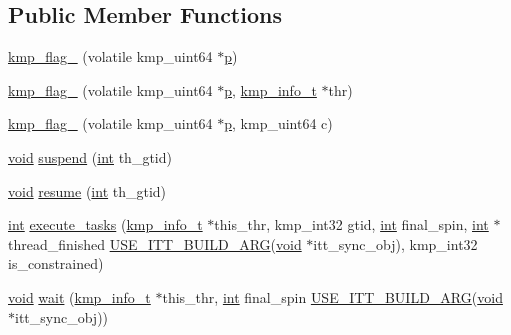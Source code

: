 \subsection*{Public Member Functions}
\begin{DoxyCompactItemize}
\item 
\hyperlink{classkmp__flag__64_a837c4745c75c9557cb92926763c2ab88}{kmp\-\_\-flag\-\_} (volatile kmp\-\_\-uint64 $\ast$\hyperlink{ittnotify__static_8h_ab7caea589d3ca96f9f11c78f10bff578}{p})
\item 
\hyperlink{classkmp__flag__64_a10a4b7f83ee61552e6e7dbb4f664a6c9}{kmp\-\_\-flag\-\_} (volatile kmp\-\_\-uint64 $\ast$\hyperlink{ittnotify__static_8h_ab7caea589d3ca96f9f11c78f10bff578}{p}, \hyperlink{kmp_8h_a194859801fe16b326efe34501a37c30a}{kmp\-\_\-info\-\_\-t} $\ast$thr)
\item 
\hyperlink{classkmp__flag__64_a7a108292b9fa2f59aeac457185ecca63}{kmp\-\_\-flag\-\_} (volatile kmp\-\_\-uint64 $\ast$\hyperlink{ittnotify__static_8h_ab7caea589d3ca96f9f11c78f10bff578}{p}, kmp\-\_\-uint64 c)
\item 
\hyperlink{ittnotify__static_8h_af941d56e55e3c5465135b60c4d6343ed}{void} \hyperlink{classkmp__flag__64_a56f6b96c1a0a87d217f401b43677447c}{suspend} (\hyperlink{ittnotify__static_8h_a8b8dcd723308a8cb5d84277c7a3fff70}{int} th\-\_\-gtid)
\item 
\hyperlink{ittnotify__static_8h_af941d56e55e3c5465135b60c4d6343ed}{void} \hyperlink{classkmp__flag__64_a66e511c15ef7cb302bcbda4d698d268b}{resume} (\hyperlink{ittnotify__static_8h_a8b8dcd723308a8cb5d84277c7a3fff70}{int} th\-\_\-gtid)
\item 
\hyperlink{ittnotify__static_8h_a8b8dcd723308a8cb5d84277c7a3fff70}{int} \hyperlink{classkmp__flag__64_acb768d08059a3c907c746f138a1c9f3a}{execute\-\_\-tasks} (\hyperlink{kmp_8h_a194859801fe16b326efe34501a37c30a}{kmp\-\_\-info\-\_\-t} $\ast$this\-\_\-thr, kmp\-\_\-int32 gtid, \hyperlink{ittnotify__static_8h_a8b8dcd723308a8cb5d84277c7a3fff70}{int} final\-\_\-spin, \hyperlink{ittnotify__static_8h_a8b8dcd723308a8cb5d84277c7a3fff70}{int} $\ast$thread\-\_\-finished \hyperlink{kmp__itt_8h_ac31864b9b5b30f5dcac5ab285ee97ae0}{U\-S\-E\-\_\-\-I\-T\-T\-\_\-\-B\-U\-I\-L\-D\-\_\-\-A\-R\-G}(\hyperlink{ittnotify__static_8h_af941d56e55e3c5465135b60c4d6343ed}{void} $\ast$itt\-\_\-sync\-\_\-obj), kmp\-\_\-int32 is\-\_\-constrained)
\item 
\hyperlink{ittnotify__static_8h_af941d56e55e3c5465135b60c4d6343ed}{void} \hyperlink{classkmp__flag__64_a459afc03a199c6a548049ae3a097e41f}{wait} (\hyperlink{kmp_8h_a194859801fe16b326efe34501a37c30a}{kmp\-\_\-info\-\_\-t} $\ast$this\-\_\-thr, \hyperlink{ittnotify__static_8h_a8b8dcd723308a8cb5d84277c7a3fff70}{int} final\-\_\-spin \hyperlink{kmp__itt_8h_ac31864b9b5b30f5dcac5ab285ee97ae0}{U\-S\-E\-\_\-\-I\-T\-T\-\_\-\-B\-U\-I\-L\-D\-\_\-\-A\-R\-G}(\hyperlink{ittnotify__static_8h_af941d56e55e3c5465135b60c4d6343ed}{void} $\ast$itt\-\_\-sync\-\_\-obj))

\end{DoxyCompactItemize}
